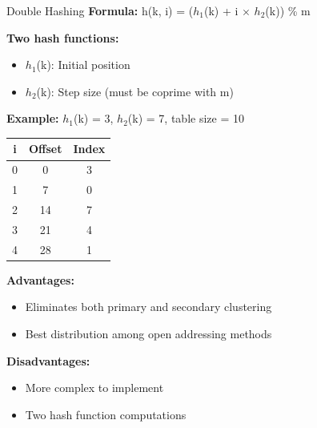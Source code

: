 \documentclass[aspectratio=169]{beamer}
\begin{document}
\begin{frame}{Double Hashing}
  \textbf{Formula:} h(k, i) = ($h_1$(k) + i $\times$ $h_2$(k)) \% m

  \textbf{Two hash functions:}
  \begin{itemize}
    \item $h_1$(k): Initial position
    \item $h_2$(k): Step size (must be coprime with m)
  \end{itemize}

  \vspace{0.3cm}
  \textbf{Example:} $h_1$(k) = 3, $h_2$(k) = 7, table size = 10
  \begin{center}
    \begin{tabular}{c|c|c}
      i & Offset & Index \\
      \hline
      0 & 0 & 3 \\
      1 & 7 & 0 \\
      2 & 14 & 7 \\
      3 & 21 & 4 \\
      4 & 28 & 1 \\
    \end{tabular}
  \end{center}

  \vspace{0.3cm}
  \textbf{Advantages:}
  \begin{itemize}
    \item Eliminates both primary and secondary clustering
    \item Best distribution among open addressing methods
  \end{itemize}

  \textbf{Disadvantages:}
  \begin{itemize}
    \item More complex to implement
    \item Two hash function computations
  \end{itemize}
\end{frame}
\end{document}

